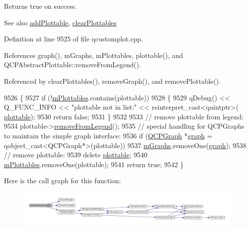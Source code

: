 Returns true on success.

\begin{DoxySeeAlso}{See also}
\hyperlink{class_q_custom_plot_ab7ad9174f701f9c6f64e378df77927a6}{add\+Plottable}, \hyperlink{class_q_custom_plot_a9a409bb3201878adb7ffba1c89c4e004}{clear\+Plottables} 
\end{DoxySeeAlso}


Definition at line 9525 of file qcustomplot.\+cpp.



References graph(), m\+Graphs, m\+Plottables, plottable(), and Q\+C\+P\+Abstract\+Plottable\+::remove\+From\+Legend().



Referenced by clear\+Plottables(), remove\+Graph(), and remove\+Plottable().


\begin{DoxyCode}
9526 \{
9527   \textcolor{keywordflow}{if} (!\hyperlink{class_q_custom_plot_a62bf8e4e7f8d23fc1e9301ba0148269f}{mPlottables}.contains(plottable))
9528   \{
9529     qDebug() << Q\_FUNC\_INFO << \textcolor{stringliteral}{"plottable not in list:"} << \textcolor{keyword}{reinterpret\_cast<}quintptr\textcolor{keyword}{>}(
      \hyperlink{class_q_custom_plot_adea38bdc660da9412ba69fb939031567}{plottable});
9530     \textcolor{keywordflow}{return} \textcolor{keyword}{false};
9531   \}
9532   
9533   \textcolor{comment}{// remove plottable from legend:}
9534   plottable->\hyperlink{class_q_c_p_abstract_plottable_aa1f350e510326d012b9a9c9249736c83}{removeFromLegend}();
9535   \textcolor{comment}{// special handling for QCPGraphs to maintain the simple graph interface:}
9536   \textcolor{keywordflow}{if} (\hyperlink{class_q_c_p_graph}{QCPGraph} *\hyperlink{class_q_custom_plot_a80c40ced2a74eefe9e92de1e82ba2274}{graph} = qobject\_cast<QCPGraph*>(plottable))
9537     \hyperlink{class_q_custom_plot_adaf8d407d72a725169d7dbed2ee386bb}{mGraphs}.removeOne(\hyperlink{class_q_custom_plot_a80c40ced2a74eefe9e92de1e82ba2274}{graph});
9538   \textcolor{comment}{// remove plottable:}
9539   \textcolor{keyword}{delete} \hyperlink{class_q_custom_plot_adea38bdc660da9412ba69fb939031567}{plottable};
9540   \hyperlink{class_q_custom_plot_a62bf8e4e7f8d23fc1e9301ba0148269f}{mPlottables}.removeOne(plottable);
9541   \textcolor{keywordflow}{return} \textcolor{keyword}{true};
9542 \}
\end{DoxyCode}


Here is the call graph for this function\+:\nopagebreak
\begin{figure}[H]
\begin{center}
\leavevmode
\includegraphics[width=350pt]{class_q_custom_plot_af3dafd56884208474f311d6226513ab2_cgraph}
\end{center}
\end{figure}




